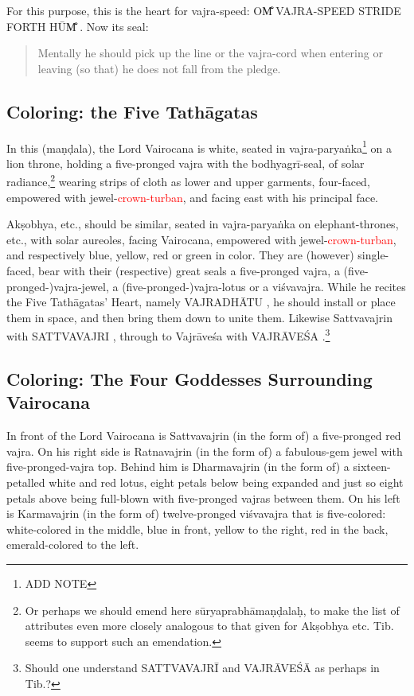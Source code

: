 \documentclass[11pt]{book}
\makeatletter
\def\fakesc#1{%
  \begingroup%
  \xdef\fake@name{\csname\curr@fontshape/\f@size\endcsname}%
  \fontsize{1.3\fontdimen8\fake@name}{\baselineskip}\selectfont%
  \uppercase{#1}%
  \endgroup%
}
\newcommand{\mantra}[1]{\fakesc{#1}}
\newcommand{\red}[1]{\textcolor{red}{#1}}
\makeatother
\begin{document}
For this purpose, this is the heart for vajra-speed: \mantra{om̐ vajra-speed stride forth hūm̐}. Now its seal:

\begin{verse}
Mentally he should pick up the line or the vajra-cord when entering or leaving (so that) he does not fall from the pledge.
\end{verse}

\subsection{Coloring: the Five Tathāgatas}
In this (maṇḍala), the Lord Vairocana is white, seated in vajra-paryaṅka\footnote{ADD NOTE} on a lion throne, holding a five-pronged vajra with the bodhyagrī-seal, of solar radiance,\footnote{Or perhaps we should emend here sūryaprabhāmaṇḍalaḥ, to make the list of attributes even more closely analogous to that given for Akṣobhya etc. Tib. seems to support such an emendation.} wearing strips of cloth as lower and upper garments, four-faced, empowered with jewel-\red{crown-turban}, and facing east with his principal face.

Akṣobhya, etc., should be similar, seated in vajra-paryaṅka on elephant-thrones, etc., with solar aureoles, facing Vairocana, empowered with jewel-\red{crown-turban}, and respectively blue, yellow, red or green in color. They are (however) single-faced, bear with their (respective) great seals a five-pronged vajra, a (five-pronged-)vajra-jewel, a (five-pronged-)vajra-lotus or a viśvavajra. While he recites the Five Tathāgatas' Heart, namely \mantra{vajradhātu}, he should install or place them in space, and then bring them down to unite them. Likewise Sattvavajrin with \mantra{sattvavajri}, through to Vajrāveśa with \mantra{vajrāveśa}.\footnote{Should one understand \mantra{sattvavajrī} and  \mantra{vajrāveśā} as perhaps in Tib.?}

\subsection{Coloring: The Four Goddesses Surrounding Vairocana}
In front of the Lord Vairocana is Sattvavajrin (in the form of) a five-pronged red vajra.
On his right side is Ratnavajrin (in the form of) a fabulous-gem jewel with five-pronged-vajra top.
Behind him is Dharmavajrin (in the form of) a sixteen-petalled white and red lotus, eight petals below being expanded and just so eight petals above being full-blown with five-pronged vajras between them. On his left is Karmavajrin (in the form of) twelve-pronged viśvavajra that is five-colored: white-colored in the middle, blue in front, yellow to the right, red in the back, emerald-colored to the left.
\end{document}
